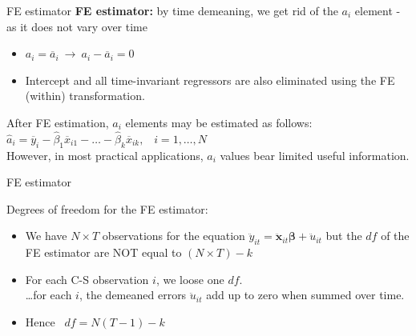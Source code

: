 \documentclass[usenames,dvipsnames]{beamer}
\begin{document}
\begin{frame}{FE estimator}
\textbf{FE estimator:} by time demeaning, we get rid of the $a_i$ element - as it does not vary over time 
\vspace{0.5cm}
\begin{itemize}
\item $a_i = \overline{a}_i \ \rightarrow \ a_i - \overline{a}_i = 0$
\item Intercept and all time-invariant regressors are also eliminated using the FE (within) transformation.
\end{itemize}
\vspace{0.5cm}
After FE estimation, $a_i$ elements may be estimated as follows:
$\hat{a}_i =\overline{y}_i - \hat{\beta}_1 \overline{x}_{i1} - \dots - \hat{\beta}_k \overline{x}_{ik},$ \ $i = 1, \dots, N$ \\
\vspace{0.5cm}
However, in most practical applications, $a_i$ values bear limited useful information.\\
\end{frame}
\begin{frame}{FE estimator}

Degrees of freedom for the FE estimator:
\begin{itemize}
\vspace{0.5cm}
\item We have $N \times T$ observations for the equation $\ddot{y}_{it} = \bm{\ddot{x}}_{it} \bm{\beta} + \ddot{u}_{it}$ but the $df$ of the FE estimator are NOT equal to $(N \times T) - k$
\vspace{0.5cm}
\item For each C-S observation $i$, we loose one $df$.\\
\dots for each $i$, the demeaned errors $\ddot{u}_{it}$ add up to zero when summed over time. 
\item Hence \ $df = N(T-1)-k$
\end{itemize}
\end{frame}
\end{document}
